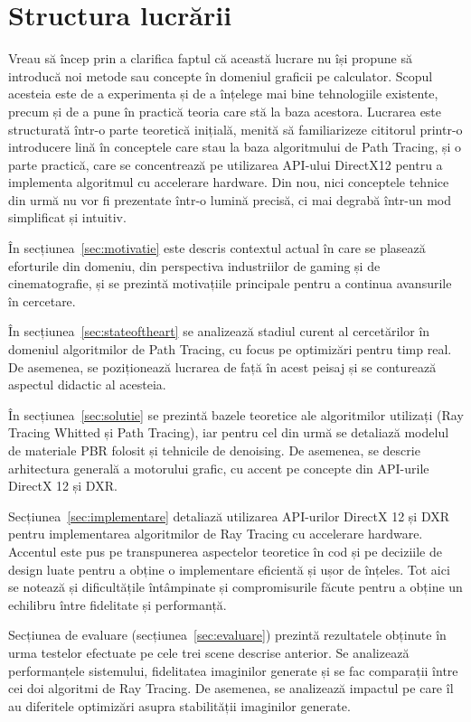 \documentclass[12pt,a4paper]{report}
\numberwithin{equation}{section} %
\begin{document}
\section{Structura lucrării}

Vreau să încep prin a clarifica faptul că această lucrare nu își propune să introducă
noi metode sau concepte în domeniul graficii pe calculator. Scopul acesteia
este de a experimenta și de a înțelege mai bine tehnologiile existente, precum
și de a pune în practică teoria care stă la baza acestora. Lucrarea este structurată
într-o parte teoretică inițială, menită să familiarizeze cititorul printr-o introducere lină
în conceptele care stau la baza algoritmului de Path Tracing, și o parte practică,
care se concentrează pe utilizarea API-ului DirectX12 pentru a implementa algoritmul
cu accelerare hardware. Din nou, nici conceptele tehnice din urmă nu vor fi prezentate
într-o lumină precisă, ci mai degrabă într-un mod simplificat și intuitiv.

În secțiunea~\ref{sec:motivatie} este descris contextul actual în care se plasează
eforturile din domeniu, din perspectiva industriilor de gaming și de cinematografie,
și se prezintă motivațiile principale pentru a continua avansurile în cercetare.

În secțiunea~\ref{sec:stateoftheart} se analizează stadiul curent al cercetărilor
în domeniul algoritmilor de Path Tracing, cu focus pe optimizări pentru timp real.
De asemenea, se poziționează lucrarea de față în acest peisaj și se conturează
aspectul didactic al acesteia.

În secțiunea~\ref{sec:solutie} se prezintă bazele teoretice ale algoritmilor
utilizați (Ray Tracing Whitted și Path Tracing), iar pentru cel din urmă se
detaliază modelul de materiale PBR folosit și tehnicile de denoising. De asemenea, se descrie arhitectura
generală a motorului grafic, cu accent pe concepte din API-urile DirectX 12 și
DXR.

Secțiunea~\ref{sec:implementare} detaliază utilizarea API-urilor DirectX 12 și DXR
pentru implementarea algoritmilor de Ray Tracing cu accelerare hardware. Accentul
este pus pe transpunerea aspectelor teoretice în cod și pe deciziile de design luate pentru a obține o implementare
eficientă și ușor de înțeles. Tot aici se notează și dificultățile întâmpinate
și compromisurile făcute pentru a obține un echilibru între fidelitate și performanță.

Secțiunea de evaluare (secțiunea~\ref{sec:evaluare}) prezintă rezultatele obținute
în urma testelor efectuate pe cele trei scene descrise anterior. Se analizează
performanțele sistemului, fidelitatea imaginilor generate și se fac comparații
între cei doi algoritmi de Ray Tracing. De asemenea, se analizează impactul pe
care îl au diferitele optimizări asupra stabilității imaginilor generate.
\end{document}
